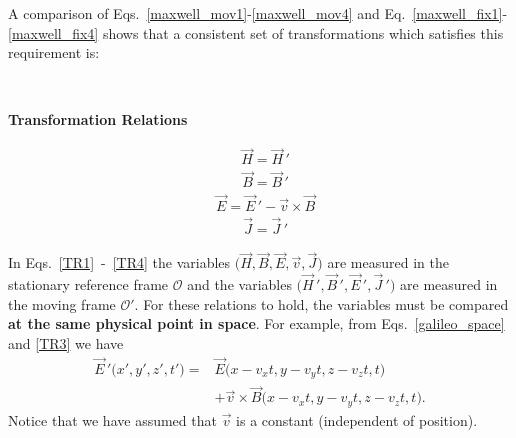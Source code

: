 \documentclass[12pt,a4paper,oneside]{book}
\begin{document}
\begin{onehalfspace}
A comparison of Eqs.~\ref{maxwell_mov1}-\ref{maxwell_mov4} and 
Eq.~\ref{maxwell_fix1}-\ref{maxwell_fix4} shows that a consistent set of 
transformations which satisfies this requirement is:
\begin{mybox}
	\bigskip \ \newline	\centerline{\textbf{Transformation Relations}}
	\begin{equation}\label{TR1}
		\begin{aligned}
			&\vec{H}=\vec{H}\,'
		\end{aligned}
	\end{equation} 
	\begin{equation}\label{TR2}
		\begin{aligned}
			&\vec{B}=\vec{B}\,'
		\end{aligned}
	\end{equation} 
	\begin{equation}\label{TR3}
		\begin{aligned}
			&\vec{E} =\vec{E}\,'-\vec{v}\times\vec{B}
		\end{aligned}
	\end{equation} 
	\begin{equation}\label{TR4}
		\begin{aligned}
			&\vec{J}=\vec{J}\,'
		\end{aligned}
	\end{equation} 
\end{mybox}
In Eqs.~\ref{TR1}~-~\ref{TR4} the variables 
$\big(\vec{H},\vec{B},\vec{E},\vec{v},\vec{J}\big)$ are measured in the 
stationary reference frame $\mathcal{O}$ and the variables 
$\big(\vec{H}\,',\vec{B}\,',\vec{E}\,',\vec{J}\,'\big)$ are measured in the 
moving frame $\mathcal{O}'$. For these relations to hold, the variables must be 
compared \textbf{at the same physical point in space}. For example, from 
Eqs.~\ref{galileo_space} and \ref{TR3} we have
\begin{equation*}
	\begin{aligned}
		\vec{E}\,'\big(x',y',z',t'\big)= & 
		\vec{E}\big(x-v_xt,y-v_yt,z-v_zt,t\big) \\[8pt]
		&+ \vec{v}\times\vec{B}\big(x-v_xt,y-v_yt,z-v_zt,t\big).
	\end{aligned}
\end{equation*} 
Notice that we have assumed that $\vec{v}$ is a constant (independent of 
position). 


\end{onehalfspace}
\end{document}
